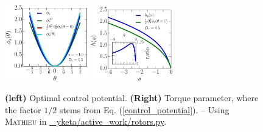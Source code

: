 \documentclass[pre,aps,superscriptaddress,nofootinbib]{revtex4}
\begin{document}
\begin{figure}[H]
\centering
\includegraphics[width=0.32\textwidth]{mathieu_potential.eps}
\includegraphics[width=0.32\textwidth]{distribution_g.eps}
\caption{\textbf{(left)} Optimal control potential. \textbf{(Right)} Torque parameter, where the factor $1/2$ stems from Eq. (\ref{control_potential}). -- Using \textsc{Mathieu} in \href{https://github.com/yketa/active_work/blob/master/rotors.py}{\faGithub~ yketa/active\_work/rotors.py}.}
\label{mathieu_potential_fig}
\end{figure}


{\renewcommand{\bibname}{References}}
\end{document}
